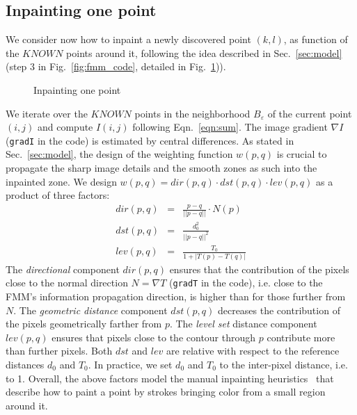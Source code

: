 \documentclass{llncs}
\begin{document}
\subsection{Inpainting one point}   
\label{sec:inp_function}
%
%
We consider now how to inpaint a newly discovered point $(k,l)$, as function of the
$KNOWN$ points around it, following the idea described in Sec.~\ref{sec:model}
(step 3 in Fig.~\ref{fig:fmm_code}, detailed in Fig.~\ref{fig:inpaint_code})).
%
	\begin{figure}[h] \centering
	\caption{Inpainting one point}
	\label{fig:inpaint_code} 
        \end{figure} 
%
We iterate over the $KNOWN$ points in the neighborhood $B_{\varepsilon}$ of
the current point $(i,j)$ and compute $I(i,j)$ following
Eqn.~\ref{eqn:sum}. The image gradient $\nabla I$ (\texttt{gradI} in the
code) is estimated by central differences. As stated in Sec.~\ref{sec:model}, the design of the
weighting function $w(p,q)$ is crucial to propagate the sharp image details and the smooth
zones as such into the inpainted zone. We design $w(p,q) = dir(p,q) \cdot
dst(p,q) \cdot lev(p,q)$ as a product of three factors:
%
%
%
%
\begin{eqnarray*}
  dir(p,q) &=& \frac{p-q}{||p-q||} \cdot N(p)\\
  dst(p,q) &=& \frac{d_0^2}{||p-q||^2} \\
  lev(p,q) &=& \frac{T_0}{1+|T(p)-T(q)|}  
\end{eqnarray*}
%
%
The \textit{directional} component $dir(p,q)$ ensures that the
contribution of the pixels close to the normal direction
$N=\nabla T$ (\texttt{gradT} in the code), i.e. close to the
FMM's information propagation direction, is higher than for those further from
$N$. The \textit{geometric distance} component $dst(p,q)$ decreases the
contribution of the pixels geometrically farther from $p$.  
The \textit{level set} distance
component $lev(p,q)$ ensures that pixels close to the contour
through $p$ contribute more than further pixels. Both $dst$ and $lev$ are
relative with respect to the reference distances $d_0$ and $T_0$. In practice, we set
$d_0$ and $T_0$ to the inter-pixel distance, i.e. to 1.
Overall, the above factors model the manual inpainting heuristics~\cite{bertalmio1} that
describe how to paint a point by strokes bringing color from a small region
around it.
\end{document}
